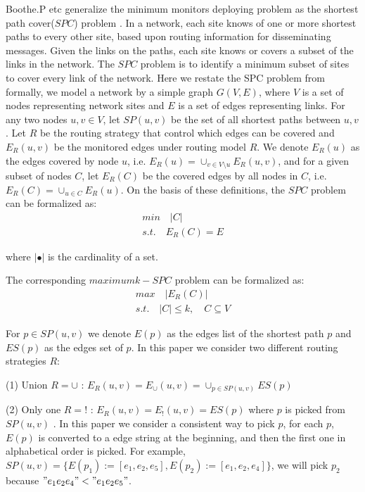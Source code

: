 \documentclass[review]{elsarticle}
\begin{document}
Boothe.P etc generalize the minimum monitors deploying problem as the shortest path cover($SPC$) problem \cite{boothe2007graph}. In a network, each site knows of one or more shortest paths to every other site, based upon routing information for disseminating messages. Given the links on the paths, each site knows or covers a subset of the links in the network. The $SPC$ problem is to identify a minimum subset of sites to cover every link of the network. Here we restate the SPC problem from \cite{boothe2007graph,pignolet2017tomographic} formally,  we model a network by a simple graph $G(V,E)$, where $V$ is a set of nodes representing network sites and $E$ is a set of  edges representing links. For any two nodes $u,v \in V $, let $SP(u,v)$ be the set of all shortest paths between $u,v$. Let $R$ be the routing strategy that control which edges can be covered and $E_R(u,v)$ be the monitored edges under routing model $R$. We denote $E_R(u)$ as the edges covered by node $u$, i.e. $E_R(u)=\cup_{v \in V \setminus u}E_R(u,v)$, and for a given subset of nodes $C$, let $E_R(C)$ be the covered edges by all nodes in $C$,  i.e. $E_R(C)=\cup_{u \in C} E_R(u)$. On the basis of these definitions, the $SPC$ problem can be formalized as:
\begin{gather*}
min    \quad \lvert C \lvert \\
s.t.   \quad E_R(C)=E
\end{gather*}

where $\lvert \bullet \rvert$ is the cardinality of a set.

The corresponding $maximum k-SPC$ problem can be formalized as:
\begin{gather*}
max   \quad   \lvert E_R(C) \rvert \\
s.t.  \quad \lvert C \rvert \leq k, \quad C \subseteq V
\end{gather*}

For $p \in SP(u,v)$ we denote $E(p)$ as the edges list of the shortest path $p$ and $ES(p)$ as the edges set of $p$. In this paper we consider two different routing strategies $R$:

(1) Union $R=\cup$ : $E_R(u,v)=E_{\cup}(u,v)=\cup_{p \in SP(u,v)}ES(p)$

(2) Only one $R=!$ : $E_R(u,v)=E_!(u,v)=ES(p)$ where $p$ is picked from $SP(u,v)$ . In this paper we consider a  consistent way to pick $p$, for each $p$, $E(p)$ is converted to a edge string at the beginning, and then the first one in alphabetical order is picked. For example,  $SP(u,v)=\{E(p_1):=[e_1, e_2,e_5], E(p_2):=[e_1, e_2,e_4]\}$, we will pick $p_2$ because $"e_1e_2e_4"<"e_1e_2e_5"$.
\end{document}
